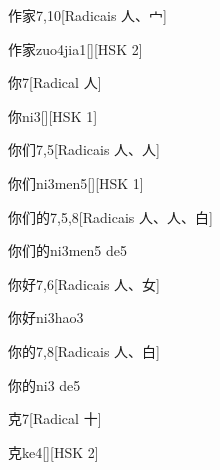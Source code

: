 \begin{entry}{作家}{7,10}[Radicais ⼈、⼧]
  \begin{phonetics}{作家}{zuo4jia1}[][HSK 2]
  \end{phonetics}
\end{entry}

\begin{entry}{你}{7}[Radical ⼈]
  \begin{phonetics}{你}{ni3}[][HSK 1]
  \end{phonetics}
\end{entry}

\begin{entry}{你们}{7,5}[Radicais ⼈、⼈]
  \begin{phonetics}{你们}{ni3men5}[][HSK 1]
  \end{phonetics}
\end{entry}

\begin{entry}{你们的}{7,5,8}[Radicais ⼈、⼈、⽩]
  \begin{phonetics}{你们的}{ni3men5 de5}
  \end{phonetics}
\end{entry}

\begin{entry}{你好}{7,6}[Radicais ⼈、⼥]
  \begin{phonetics}{你好}{ni3hao3}
  \end{phonetics}
\end{entry}

\begin{entry}{你的}{7,8}[Radicais ⼈、⽩]
  \begin{phonetics}{你的}{ni3 de5}
  \end{phonetics}
\end{entry}

\begin{entry}{克}{7}[Radical ⼗]
  \begin{phonetics}{克}{ke4}[][HSK 2]
  \end{phonetics}
\end{entry}

